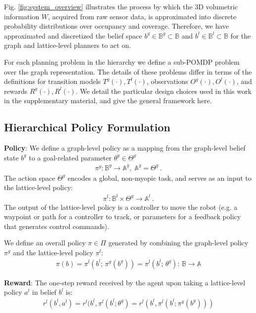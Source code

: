 \documentclass[letterpaper]{article} %
\newcommand{\ph}[1]{{\textbf{#1}:}} %
\begin{document}
Fig. \ref{fig:system_overview} illustrates the process by which the 3D volumetric information $W$, acquired from raw sensor data, is approximated into discrete probability distributions over occupancy and coverage. 
Therefore, we have approximated and discretized the belief space $b^g\in\mathbb{B}^g\subset\mathbb{B}$ and $b^l\in\mathbb{B}^l\subset\mathbb{B}$ for the graph and lattice-level planners to act on.

For each planning problem in the hierarchy we define a sub-POMDP problem over the graph representation.  The details of these problems differ in terms of the definitions for transition models $T^g(\cdot),T^l(\cdot)$, observations $O^g(\cdot),O^l(\cdot)$, and rewards $R^g(\cdot),R^l(\cdot)$.  We detail the particular design choices used in this work in the supplementary material, and give the general framework here.

\subsection{Hierarchical Policy Formulation}
\label{sec:hierarchical_policy}
\ph{Policy} We define a graph-level policy as a mapping from the graph-level belief state $b^g$ to a goal-related parameter $\theta^g \in \Theta^g$ 
\begin{align}
    \pi^g : \mathbb{B}^g \to \mathbb{A}^g, \; \mathbb{A}^g = \Theta^g\ .
\end{align}
The action space $\Theta^g$ encodes a global, non-myopic task, and serves as an input to the lattice-level policy: 
\begin{align}
    \pi^l: \mathbb{B}^l \times \Theta^g \to \mathbb{A}^l\ .
\end{align}
The output of the lattice-level policy is a controller to move the robot (e.g. a waypoint or path for a controller to track, or parameters for a feedback policy that generates control commands).

We define an overall policy $\pi \in \Pi$ generated by combining the graph-level policy $\pi^g$ and the lattice-level policy $\pi^l$:
\begin{align}
    \pi(b) = \pi^l(b^l; \, \pi^g(b^g)) = \pi^l(b^l; \, \theta^g) : \, \mathbb{B}\rightarrow \mathbb{A} 
\end{align}

\ph{Reward} The one-step reward received by the agent upon taking a lattice-level policy $a^l$ in belief $b^l$ is:
\begin{align}
    r^l(b^l, a^l) = r^l(b^l, \pi^l(b^l; \theta^g) = r^l(b^l, \pi^l(b^l; \pi^g(b^g)))
    \label{eq:reward}
\end{align}
\end{document}
